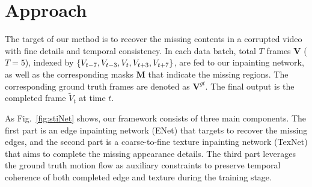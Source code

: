 

\section{Approach}\label{sec:approach}

The target of our method is to recover the missing contents in a corrupted video with fine details and temporal consistency.
%
In each data batch,  total $T$ frames $\boldsymbol{V}$ ($T=5$), indexed by $\{V_{t-7},V_{t-3},V_{t},V_{t+3},V_{t+7}\}$, are fed to our inpainting network, as well as the corresponding masks $\boldsymbol{M}$ that indicate the missing regions. 
The corresponding ground truth frames are denoted as $\boldsymbol{V}^{gt}$.
The final output is the completed frame \(\widetilde{V}_t\) at time $t$. 
 
As Fig.~\ref{fig:stiNet} shows, our framework consists of three main components. 
The first part is an edge inpainting network (ENet) that targets to recover the missing edges, and the second part is a coarse-to-fine texture inpainting network (TexNet) that aims to complete the missing appearance details. 
The third part leverages the ground truth motion flow as auxiliary constraints to preserve temporal coherence of both completed edge and texture during the training stage.

